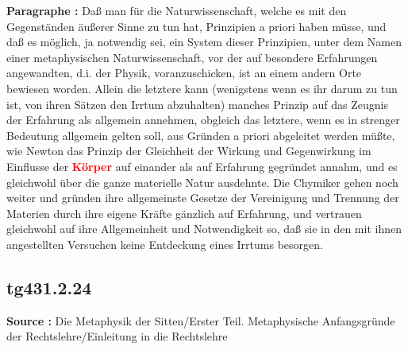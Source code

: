 \documentclass[a4paper,12pt,twoside]{book}
\newcommand{\match}[1]{\textcolor{red}{\textbf{#1}}}
\begin{document}
	\textbf{Paragraphe : }Daß man für die Naturwissenschaft, welche es mit den Gegenständen äußerer Sinne zu tun hat, Prinzipien a priori haben müsse, und daß es möglich, ja notwendig sei, ein System dieser Prinzipien, unter dem Namen einer metaphysischen Naturwissenschaft, vor der auf besondere Erfahrungen angewandten, d.i. der Physik, voranzuschicken, ist an einem andern Orte bewiesen worden. Allein die letztere kann (wenigstens wenn es ihr darum zu tun ist, von ihren Sätzen den Irrtum abzuhalten) manches Prinzip auf das Zeugnis der Erfahrung als allgemein annehmen, obgleich das letztere, wenn es in strenger Bedeutung allgemein gelten soll, aus Gründen a priori abgeleitet werden müßte, wie Newton das Prinzip der Gleichheit der Wirkung und Gegenwirkung im Einflusse der \match{Körper} auf einander als auf Erfahrung gegründet annahm, und es gleichwohl über die ganze materielle Natur ausdehnte. Die Chymiker gehen noch weiter und gründen ihre allgemeinste Gesetze der Vereinigung und Trennung der Materien durch ihre eigene Kräfte gänzlich auf Erfahrung, und vertrauen gleichwohl auf ihre Allgemeinheit und Notwendigkeit so, daß sie in den mit ihnen angestellten Versuchen keine Entdeckung eines Irrtums besorgen. 
	
	\subsection*{tg431.2.24} 
	\textbf{Source : }Die Metaphysik der Sitten/Erster Teil. Metaphysische Anfangsgründe der Rechtslehre/Einleitung in die Rechtslehre\\  
	
\end{document}
